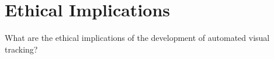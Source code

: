 \section{Ethical Implications}
What are the ethical implications of the development of automated visual tracking?